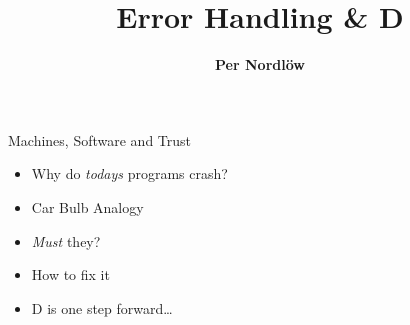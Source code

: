 \documentclass[xcolor=dvipsnames]{beamer}
\title[Error Handling \& D]{Error Handling \& D}
\author[Per Nordlöw%
]{\textbf {Per Nordlöw%
  }} %
\begin{document}
\begin{frame}[fragile]
  \begin{figure}
  \end{figure}
  \maketitle
\end{frame}


\begin{frame}[fragile]{Machines, Software and Trust}
  \begin{figure}
  \end{figure}
  \begin{itemize}[<+->]
  \item Why do \textit{todays} programs crash?
  \item Car Bulb Analogy
  \item \emph{Must} they?
  \item How to fix it
  \item D is one step forward\ldots
  \end{itemize}
\end{frame}
\end{document}
